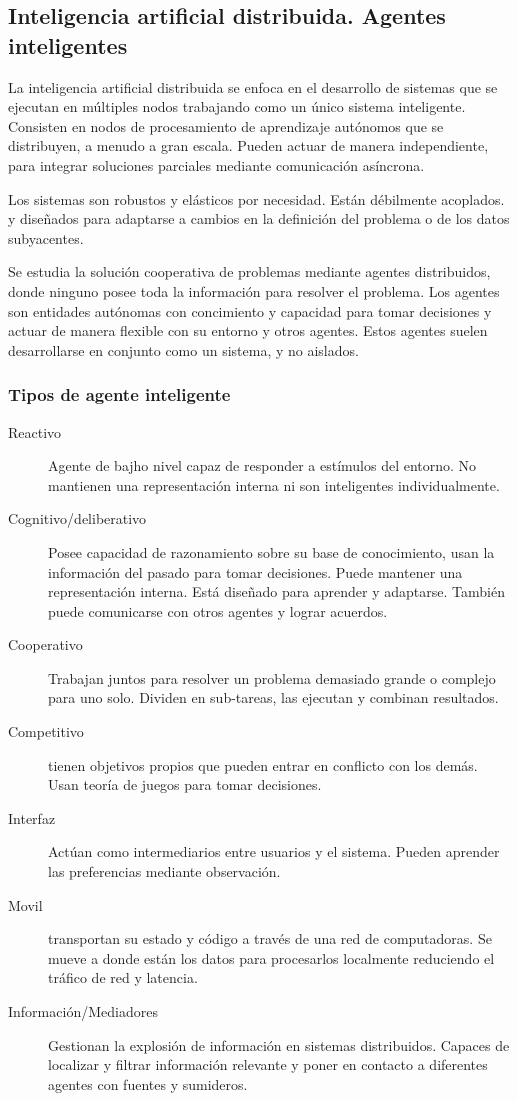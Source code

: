 \subsection{Inteligencia artificial distribuida. Agentes inteligentes}
    La inteligencia artificial distribuida se enfoca en el desarrollo de sistemas que se ejecutan en múltiples nodos trabajando como un único sistema inteligente. Consisten en nodos de procesamiento de aprendizaje autónomos que se distribuyen, a menudo a gran escala. Pueden actuar de manera independiente, para integrar soluciones parciales mediante comunicación asíncrona.

    Los sistemas son robustos y elásticos por necesidad. Están débilmente acoplados. y diseñados para adaptarse a cambios en la definición del problema o de los datos subyacentes.

    Se estudia la solución cooperativa de problemas mediante agentes distribuidos, donde ninguno posee toda la información para resolver el problema. Los agentes son entidades autónomas con concimiento y capacidad para tomar decisiones y actuar de manera flexible con su entorno y otros agentes. Estos agentes suelen desarrollarse en conjunto como un sistema, y no aislados.

    \subsubsection{Tipos de agente inteligente}
        \begin{description}
            \item[Reactivo] Agente de bajho nivel capaz de responder a estímulos del entorno. No mantienen una representación interna ni son inteligentes individualmente.
            \item[Cognitivo/deliberativo] Posee capacidad de razonamiento sobre su base de conocimiento, usan la información del pasado para tomar decisiones. Puede mantener una representación interna. Está diseñado para aprender y adaptarse. También puede comunicarse con otros agentes y lograr acuerdos.
            \item[Cooperativo] Trabajan juntos para resolver un problema demasiado grande o complejo para uno solo. Dividen en sub-tareas, las ejecutan y combinan resultados.
            \item[Competitivo] tienen objetivos propios que pueden entrar en conflicto con los demás. Usan teoría de juegos para tomar decisiones.
            \item[Interfaz] Actúan como intermediarios entre usuarios y el sistema. Pueden aprender las preferencias mediante observación.
            \item[Movil] transportan su estado y código a través de una red de computadoras. Se mueve a donde están los datos para procesarlos localmente reduciendo el tráfico de red y latencia.
            \item[Información/Mediadores] Gestionan la explosión de información en sistemas distribuidos. Capaces de localizar y filtrar información relevante y poner en contacto a diferentes agentes con fuentes y sumideros.
        \end{description}

